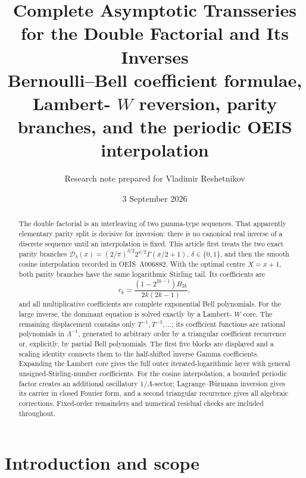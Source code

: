 \documentclass[11pt,oneside]{article}
\title{\textbf{Complete Asymptotic Transseries for the Double Factorial and Its Inverses}\\[0.4em]
\large Bernoulli--Bell coefficient formulae, Lambert-
\(W\) reversion, parity branches, and the periodic OEIS interpolation}
\author{Research note prepared for Vladimir Reshetnikov}
\date{3 September 2026}
\theoremstyle{plain}
\theoremstyle{definition}
\theoremstyle{remark}
\newcommand{\DF}{\mathcal D}
\begin{document}
\maketitle

\begin{abstract}
The double factorial is an interleaving of two gamma-type sequences.  That
apparently elementary parity split is decisive for inversion: there is no
canonical real inverse of a discrete sequence until an interpolation is fixed.
This article first treats the two exact parity branches
\(
 \DF_\delta(x)=(2/\pi)^{\delta/2}2^{x/2}\Gamma(x/2+1)
\), \(\delta\in\{0,1\}\), and then the smooth cosine interpolation recorded in
OEIS~A006882.  With the optimal centre \(X=x+1\), both parity branches have the
same logarithmic Stirling tail.  Its coefficients are
\[
 c_k=\frac{(1-2^{2k-1})B_{2k}}{2k(2k-1)},
\]
and all multiplicative coefficients are complete exponential Bell
polynomials.  For the large inverse, the dominant equation is solved exactly
by a Lambert-
\(W\) core.  The remaining displacement contains only
\(T^{-1},T^{-3},\ldots\); its coefficient functions are rational polynomials in
\(\Lambda^{-1}\), generated to arbitrary order by a triangular coefficient
recurrence or, explicitly, by partial Bell polynomials.  The first five blocks
are displayed and a scaling identity connects them to the half-shifted inverse
Gamma coefficients.  Expanding the Lambert core gives the full outer
iterated-logarithmic layer with general unsigned-Stirling-number coefficients.
For the cosine interpolation, a bounded periodic factor creates an additional
oscillatory \(1/\Lambda\)-sector; Lagrange--B\"urmann inversion gives its carrier
in closed Fourier form, and a second triangular recurrence gives all algebraic
corrections.  Fixed-order remainders and numerical residual checks are
included throughout.
\end{abstract}

\tableofcontents

\section{Introduction and scope}
\label{sec:introduction}
\end{document}
